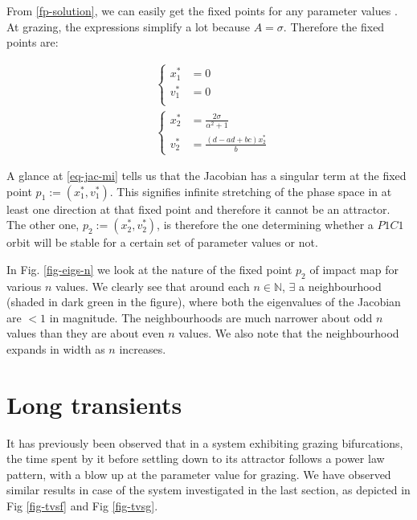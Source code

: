 \documentclass{book}
\renewcommand{\(}{\begin{columns}}
\renewcommand{\)}{\end{columns}}
\newcommand{\<}[1]{\begin{column}{#1}}
\renewcommand{\>}{\end{column}}
\begin{document}
From \eqref{fp-solution}, we can easily get the fixed points for any parameter 
values . At grazing, the expressions simplify a lot because $A=\sigma$.   
Therefore the fixed points are:

\begin{align}
\label{eq-fp-grazing}
&\begin{cases}
x_1^*&=0\\
v_1^*&=0\\
\end{cases}\\
&\begin{cases}
x_2^*&=\frac{2\sigma}{\alpha^2+1}\\
v_2^*&=\frac{(d-ad+bc)x_2^*}{b} 
\end{cases}
\end{align}

A glance at \eqref{eq-jac-mi} tells us that the Jacobian has a singular term 
at the fixed point $p_1:=(x_1^*,v_1^*)$.  This signifies infinite stretching of the 
phase space in at least one direction at that fixed point and therefore it 
cannot be an attractor.  The other one, $p_2:=(x_2^*,v_2^*)$, is therefore the one 
determining whether a $P1C1$ orbit will be stable for a certain set of 
parameter values or not.  


In Fig. \ref{fig-eigs-n} we look 
at the nature of the fixed point $p_2$ of impact map for various $n$ values. We clearly see that 
around each $n\in\mathbb{N}$, $\exists$ a neighbourhood (shaded in dark green 
in the figure), where both the eigenvalues of the Jacobian are $<1$ in 
magnitude.  The neighbourhoods are much narrower about odd $n$ values than 
they are about even $n$ values.   We also note that the neighbourhood expands 
in width as $n$ increases.  






\section{Long transients}
It has previously been observed that in a system exhibiting grazing 
bifurcations, the time spent by it before settling down to its attractor 
follows a power law pattern, with a blow up at the parameter value for 
grazing.  We have observed similar results in case of  the system investigated 
in the last section, as depicted in Fig \ref{fig-tvsf} and Fig \ref{fig-tvsg}. 
\end{document}
